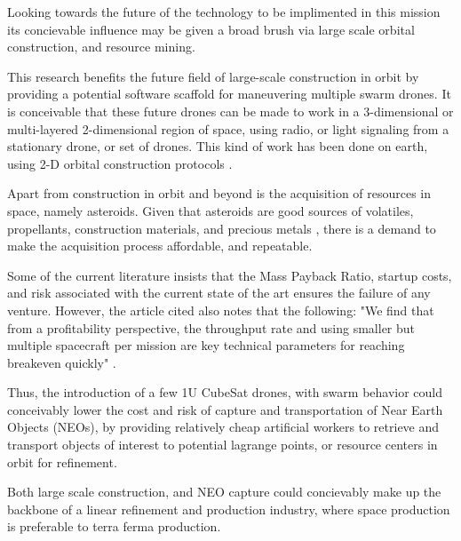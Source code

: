 Looking towards the future of the technology to be implimented in this
mission its concievable influence may be given a broad brush via large
scale orbital construction, and resource mining.

This research benefits the future field of large-scale construction in
orbit by providing a potential software scaffold for maneuvering
multiple swarm drones. It is conceivable that these future drones can
be made to work in a 3-dimensional or multi-layered 2-dimensional
region of space, using radio, or light signaling from a stationary
drone, or set of drones. This kind of work has been done on earth,
using 2-D orbital construction protocols \cite{Vardy:2018}.

Apart from construction in orbit and beyond is the acquisition of
resources in space, namely asteroids. Given that asteroids are good
sources of volatiles, propellants, construction materials, and
precious metals \cite{Ross:2020}, there is a demand to make the
acquisition process affordable, and repeatable.

Some of the current literature insists that the Mass Payback Ratio,
startup costs, and risk associated with the current state of the art
ensures the failure of any venture. However, the article
cited also notes that the following: "We find that from a
profitability perspective, the throughput rate and using smaller but
multiple spacecraft per mission are key technical parameters for
reaching breakeven quickly" \cite{Andreas:2001}.

Thus, the introduction of a few 1U CubeSat drones, with swarm behavior
could conceivably lower the cost and risk of capture and
transportation of Near Earth Objects (NEOs), by providing relatively
cheap artificial workers to retrieve and transport objects of interest
to potential lagrange points, or resource centers in orbit for
refinement.

Both large scale construction, and NEO capture could concievably make
up the backbone of a linear refinement and production industry, where
space production is preferable to terra ferma production.



